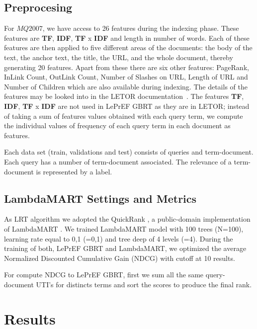 \documentclass[preprint,12pt,3p]{elsarticle}
\begin{document}
\subsection{Preprocesing}
\label{sec:preprocesing}

For $MQ2007$, we have access to 26 features during the indexing phase. These features are \textbf{TF}, \textbf{IDF}, \textbf{TF} x \textbf{IDF} and length in number of words. Each of these features are then applied to five different areas of the documents: the body of the text, the anchor text, the title, the URL, and the whole document, thereby generating 20 features. Apart from these there are six other features: PageRank, InLink Count, OutLink Count, Number of Slashes on URL, Length of URL and Number of Children which are also available during indexing. The details of the features may be looked into in the LETOR documentation~\cite{liu2007letor}. The features \textbf{TF}, \textbf{IDF}, \textbf{TF} x \textbf{IDF} are not used in LePrEF GBRT as they are in LETOR; instead of taking a sum of features values obtained with each query term, we compute the individual values of frequency of each query term in each document as features.

 Each data set (train, validations and test) consists of queries and term-document. Each query has a number of term-document associated. The relevance of a term-document is represented by a label.
 
\subsection{LambdaMART Settings and Metrics}
\label{sec:lsett}

As LRT algorithm we adopted the QuickRank \cite{capannini2016quality}, a public-domain implementation of LambdaMART \cite{wu2010lambdamart}. We trained LambdaMART model with 100 trees (N=100), learning rate equal to 0,1 (=0,1) and tree deep of 4 levels (=4). During the training of both, LePrEF GBRT and LambdaMART, we optimized the average Normalized Discounted Cumulative Gain (NDCG) with cutoff at 10 results.
 
For compute NDCG to LePrEF GBRT, first we sum all the same query-document UTI's for distincts terms and sort the scores to produce the final rank.

\section{Results}
\label{results}
\end{document}
